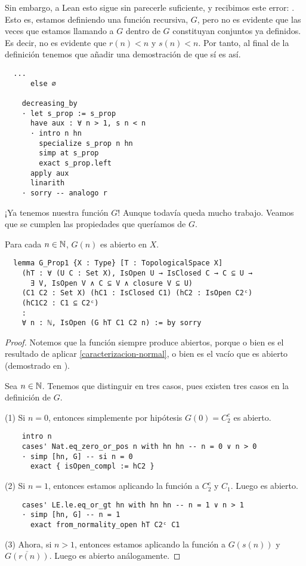 Sin embargo, a Lean esto sigue sin parecerle suficiente, y recibimos este error: . Esto es, estamos definiendo una función recursiva, $G$, pero no es evidente que las veces que estamos llamando a $G$ dentro de $G$ constituyan conjuntos ya definidos. Es decir, no es evidente que $r(n) < n$ y $s(n) < n$. Por tanto, al final de la definición tenemos que añadir una demostración de que sí es así.

\begin{lstlisting}
  ...
      else ∅

    decreasing_by
    · let s_prop := s_prop
      have aux : ∀ n > 1, s n < n
      · intro n hn
        specialize s_prop n hn
        simp at s_prop
        exact s_prop.left
      apply aux
      linarith
    · sorry -- analogo r
\end{lstlisting}

¡Ya tenemos nuestra función $G$! Aunque todavía queda mucho trabajo. Veamos que se cumplen las propiedades que queríamos de $G$.

\begin{lemma}
  Para cada $n \in \mathbb{N}$, $G(n)$ es abierto en $X$.
\end{lemma}

\begin{lstlisting}
  lemma G_Prop1 {X : Type} [T : TopologicalSpace X]
    (hT : ∀ (U C : Set X), IsOpen U → IsClosed C → C ⊆ U →
      ∃ V, IsOpen V ∧ C ⊆ V ∧ closure V ⊆ U)
    (C1 C2 : Set X) (hC1 : IsClosed C1) (hC2 : IsOpen C2ᶜ)
    (hC1C2 : C1 ⊆ C2ᶜ)
    :
    ∀ n : ℕ, IsOpen (G hT C1 C2 n) := by sorry
\end{lstlisting}

\begin{proof}
  Notemos que la función  siempre produce abiertos, porque o bien es el resultado de aplicar \ref{caracterizacion-normal}, o bien es el vacío que es abierto (demostrado en ).

  Sea $n \in \mathbb{N}$. Tenemos que distinguir en tres casos, pues existen tres casos en la definición de $G$.

  (1) Si $n = 0$, entonces simplemente por hipótesis $G(0) = C_2^c$ es abierto.

  \begin{lstlisting}
    intro n
    cases' Nat.eq_zero_or_pos n with hn hn -- n = 0 ∨ n > 0
    · simp [hn, G] -- si n = 0
      exact { isOpen_compl := hC2 }
  \end{lstlisting}

  (2) Si $n = 1$, entonces estamos aplicando la función  a $C_2^c$ y $C_1$. Luego es abierto.

  \begin{lstlisting}
    cases' LE.le.eq_or_gt hn with hn hn -- n = 1 ∨ n > 1
    · simp [hn, G] -- n = 1
      exact from_normality_open hT C2ᶜ C1
  \end{lstlisting}

  (3) Ahora, si $n > 1$, entonces estamos aplicando la función  a $G(s(n))$ y $\overline{G(r(n))}$. Luego es abierto análogamente.
\end{proof}

